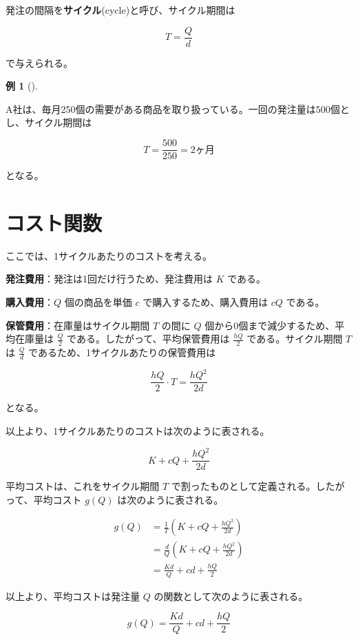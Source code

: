 \documentclass[
  japanese,
  letterpaper,
]{ltjbook}
\theoremstyle{plain}
\theoremstyle{definition}
\newtheorem{example}{例}[chapter]
\theoremstyle{remark}
\begin{document}
発注の間隔を\textbf{サイクル}(cycle)と呼び、サイクル期間は

\[
T = \frac{Q}{d}
\]

で与えられる。

\begin{example}[]\protect\hypertarget{exm-cycle}{}\label{exm-cycle}

A社は、毎月250個の需要がある商品を取り扱っている。一回の発注量は500個とし、サイクル期間は

\[
T = \frac{500}{250} = 2 \text{ヶ月}
\]

となる。

\end{example}

\section{コスト関数}\label{ux30b3ux30b9ux30c8ux95a2ux6570}

ここでは、1サイクルあたりのコストを考える。

\textbf{発注費用}：発注は1回だけ行うため、発注費用は \(K\) である。

\textbf{購入費用}：\(Q\) 個の商品を単価 \(c\) で購入するため、購入費用は
\(cQ\) である。

\textbf{保管費用}：在庫量はサイクル期間 \(T\) の間に \(Q\)
個から0個まで減少するため、平均在庫量は \(\frac{Q}{2}\)
である。したがって、平均保管費用は \(\frac{hQ}{2}\) である。サイクル期間
\(T\) は \(\frac{Q}{d}\) であるため、1サイクルあたりの保管費用は

\[
\frac{hQ}{2} \cdot T = \frac{hQ^2}{2d}
\]

となる。

以上より、1サイクルあたりのコストは次のように表される。

\[
K + cQ + \frac{hQ^2}{2d}
\]

平均コストは、これをサイクル期間 \(T\)
で割ったものとして定義される。したがって、平均コスト \(g(Q)\)
は次のように表される。

\begin{align*}
g(Q) &= \frac{1}{T} \left( K + cQ + \frac{hQ^2}{2d} \right) \\
&= \frac{d}{Q} \left( K + cQ + \frac{hQ^2}{2d} \right) \\
&= \frac{Kd}{Q} + c d + \frac{hQ}{2}
\end{align*}

以上より、平均コストは発注量 \(Q\) の関数として次のように表される。

\[
g(Q) = \frac{Kd}{Q} + cd + \frac{hQ}{2}
\]
\end{document}
